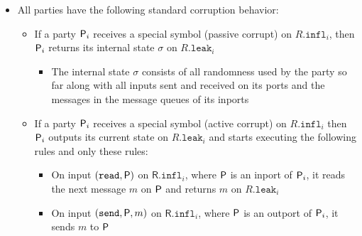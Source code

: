 \begin{itemize}
  \item All parties have the following standard corruption behavior:
  \begin{itemize}
  	\item If a party $\P_i$ receives a special symbol (passive corrupt) on $R.\mathtt{infl}_i$, then $\P_i$ returns its internal state $\sigma$ on $R.\mathtt{leak}_i$
    \begin{itemize}
  		\item The internal state $\sigma$ consists of all randomness used by the party so far along with all inputs sent and received on its ports and the messages in the message queues of its inports
    \end{itemize}
  	\item If a party $\P_i$ receives a special symbol (active corrupt) on $R.\mathtt{infl}_i$ then $\P_i$ outputs its current state on $R.\mathtt{leak}_i$ and starts executing the following rules and only these rules:
    \begin{itemize}
  		\item On input $(\mathtt{read}, \P)$ on $\mathsf{R}.\mathtt{infl}_i$, where $\P$ is an inport of $\P_i$, it reads the next message $m$ on $\P$ and returns $m$ on $R.\mathtt{leak}_i$
  		\item On input $(\mathtt{send}, \P, m)$ on $\mathsf{R}.\mathtt{infl}_i$, where $\P$ is an outport of $\P_i$, it sends $m$ to $\P$
    \end{itemize}
  \end{itemize}
\end{itemize}


